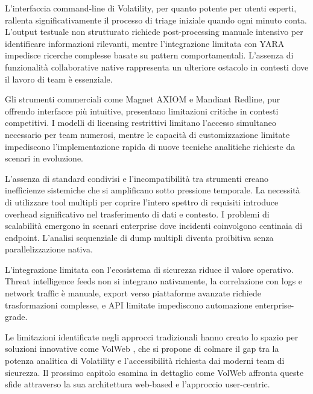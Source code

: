 L'interfaccia command-line di Volatility, per quanto potente per utenti esperti, rallenta significativamente il processo di triage iniziale quando ogni minuto conta. L'output testuale non strutturato richiede post-processing manuale intensivo per identificare informazioni rilevanti, mentre l'integrazione limitata con YARA impedisce ricerche complesse basate su pattern comportamentali. L'assenza di funzionalità collaborative native rappresenta un ulteriore ostacolo in contesti dove il lavoro di team è essenziale.

Gli strumenti commerciali come Magnet AXIOM e Mandiant Redline, pur offrendo interfacce più intuitive, presentano limitazioni critiche in contesti competitivi. I modelli di licensing restrittivi limitano l'accesso simultaneo necessario per team numerosi, mentre le capacità di customizzazione limitate impediscono l'implementazione rapida di nuove tecniche analitiche richieste da scenari in evoluzione.

L'assenza di standard condivisi e l'incompatibilità tra strumenti creano inefficienze sistemiche che si amplificano sotto pressione temporale. La necessità di utilizzare tool multipli per coprire l'intero spettro di requisiti introduce overhead significativo nel trasferimento di dati e contesto. I problemi di scalabilità emergono in scenari enterprise dove incidenti coinvolgono centinaia di endpoint. L'analisi sequenziale di dump multipli diventa proibitiva senza parallelizzazione nativa.

L'integrazione limitata con l'ecosistema di sicurezza riduce il valore operativo. Threat intelligence feeds non si integrano nativamente, la correlazione con logs e network traffic è manuale, export verso piattaforme avanzate richiede trasformazioni complesse, e API limitate impediscono automazione enterprise-grade.

Le limitazioni identificate negli approcci tradizionali hanno creato lo spazio per soluzioni innovative come VolWeb \cite{volweb2024}, che si propone di colmare il gap tra la potenza analitica di Volatility e l'accessibilità richiesta dai moderni team di sicurezza. Il prossimo capitolo esamina in dettaglio come VolWeb affronta queste sfide attraverso la sua architettura web-based e l'approccio user-centric.